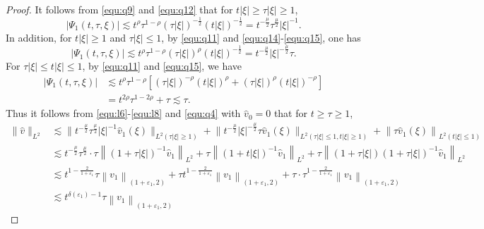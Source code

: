 \documentclass[11pt,twoside]{article}
\theoremstyle{plain}
\theoremstyle{definition}
\theoremstyle{remark}
\numberwithin{equation}{section}
\begin{document}
\begin{proof}
It follows from \eqref{equ:q9} and \eqref{equ:q12} that for $t|\xi|\geq \tau|\xi|\geq 1$,
\begin{equation}\label{equ:l6}
 \left|\Psi_1(t, \tau, \xi)\right|  \lesssim t^\rho\tau^{1-\rho}(\tau|\xi|)^{-\frac{1}{2}}(t|\xi|)^{-\frac{1}{2}}=t^{-\frac{\mu}{2}}\tau^{\frac{\mu}{2}}|\xi|^{-1}.
\end{equation}
In addition, for $t|\xi|\geq 1$ and $ \tau|\xi|\leq 1$, by \eqref{equ:q11} and \eqref{equ:q14}-\eqref{equ:q15}, one has
\begin{equation}\label{equ:l7}
\left|\Psi_1(t, \tau, \xi)\right|  \lesssim t^\rho\tau^{1-\rho}(\tau|\xi|)^{\rho}(t|\xi|)^{-\frac{1}{2}}
=t^{-\frac{\mu}{2}}|\xi|^{-\frac{\mu}{2}}\tau.
\end{equation}
For $\tau|\xi|\leq t|\xi|\leq 1$, by \eqref{equ:q11} and \eqref{equ:q15}, we have
\begin{equation}\label{equ:l8}
\begin{aligned}
\left|\Psi_1(t, \tau, \xi)\right| & \lesssim t^\rho\tau^{1-\rho}\left[(\tau|\xi|)^{-\rho}(t|\xi|)^{\rho}
+(\tau|\xi|)^{\rho}(t|\xi|)^{-\rho}\right]\\
&=t^{2\rho}\tau^{1-2\rho}+\tau\lesssim \tau.
\end{aligned}
\end{equation}
Thus it follows from \eqref{equ:l6}-\eqref{equ:l8} and \eqref{equ:q4} with $\hat{v}_0 = 0$ that for $t\geq \tau\geq1$,
\begin{equation}\label{equ:l9}
\begin{aligned}
\|\hat{v}\|_{L^2} & \lesssim\big\|t^{-\frac{\mu}{2}} \tau^{\frac{\mu}{2}}|\xi|^{-1} \hat{v}_1(\xi)\big\|_{L^2(\tau|\xi| \geqslant 1)}+\big\|t^{-\frac{\mu}{2}}|\xi|^{-\frac{\mu}{2}} \tau \hat{v}_1(\xi)\big\|_{L^2(\tau|\xi| \leqslant 1, t|\xi| \geqslant 1)}+\left\|\tau \hat{v}_1(\xi)\right\|_{L^2(t|\xi| \leqslant 1)} \\
& \lesssim t^{-\frac{\mu}{2}} \tau^{\frac{\mu}{2}} \cdot \tau\left\|(1+\tau|\xi|)^{-1} \hat{v}_1\right\|_{L^2}+\tau\left\|(1+t|\xi|)^{-1} \hat{v}_1\right\|_{L^2}+\tau\left\|(1+\tau|\xi|)(1+\tau|\xi|)^{-1} \hat{v}_1\right\|_{L^2} \\
& \lesssim t^{1-\frac{2}{1+\varepsilon_1}} \tau\left\|v_1\right\|_{\left(1+\varepsilon_1, 2\right)}+\tau t^{1-\frac{2}{1+\varepsilon_1}}\left\|v_1\right\|_{\left(1+\varepsilon_1, 2\right)}+\tau \cdot \tau^{1-\frac{2}{1+\varepsilon_1}}\left\|v_1\right\|_{\left(1+\varepsilon_1, 2\right)} \\
& \lesssim t^{\delta(\varepsilon_1)-1} \tau\left\|v_1\right\|_{\left(1+\varepsilon_1, 2\right)}

\end{aligned}
\end{equation}
\end{proof}
\end{document}
